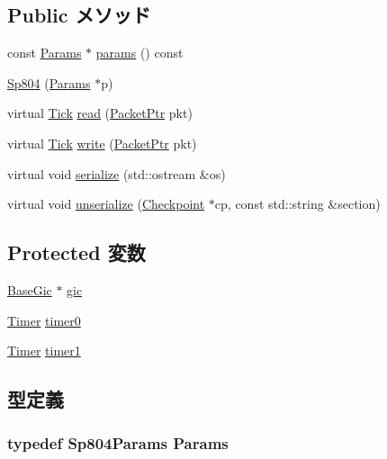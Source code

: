 \subsection*{Public メソッド}
\begin{DoxyCompactItemize}
\item 
const \hyperlink{classSp804_af822827c8c9baefc6aafbdc713bc2b8d}{Params} $\ast$ \hyperlink{classSp804_acd3c3feb78ae7a8f88fe0f110a718dff}{params} () const 
\item 
\hyperlink{classSp804_a51a53318988df11f161ff4849813bcdd}{Sp804} (\hyperlink{classSp804_af822827c8c9baefc6aafbdc713bc2b8d}{Params} $\ast$p)
\item 
virtual \hyperlink{base_2types_8hh_a5c8ed81b7d238c9083e1037ba6d61643}{Tick} \hyperlink{classSp804_a613ec7d5e1ec64f8d21fec78ae8e568e}{read} (\hyperlink{classPacket}{PacketPtr} pkt)
\item 
virtual \hyperlink{base_2types_8hh_a5c8ed81b7d238c9083e1037ba6d61643}{Tick} \hyperlink{classSp804_a4cefab464e72b5dd42c003a0a4341802}{write} (\hyperlink{classPacket}{PacketPtr} pkt)
\item 
virtual void \hyperlink{classSp804_a53e036786d17361be4c7320d39c99b84}{serialize} (std::ostream \&os)
\item 
virtual void \hyperlink{classSp804_af22e5d6d660b97db37003ac61ac4ee49}{unserialize} (\hyperlink{classCheckpoint}{Checkpoint} $\ast$cp, const std::string \&section)
\end{DoxyCompactItemize}
\subsection*{Protected 変数}
\begin{DoxyCompactItemize}
\item 
\hyperlink{classBaseGic}{BaseGic} $\ast$ \hyperlink{classSp804_a2e2266dca56928f63667e994933169ee}{gic}
\item 
\hyperlink{classSp804_1_1Timer}{Timer} \hyperlink{classSp804_a5a3102d67b545393f0fe81b35f27ee5b}{timer0}
\item 
\hyperlink{classSp804_1_1Timer}{Timer} \hyperlink{classSp804_aac7d019e29140bad89a32896ddaf7c8d}{timer1}
\end{DoxyCompactItemize}


\subsection{型定義}
\hypertarget{classSp804_af822827c8c9baefc6aafbdc713bc2b8d}{
\subsubsection[{Params}]{\setlength{\rightskip}{0pt plus 5cm}typedef Sp804Params {\bf Params}}}
\label{classSp804_af822827c8c9baefc6aafbdc713bc2b8d}


